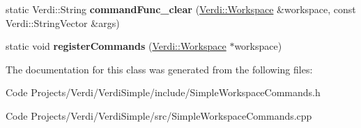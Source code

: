 \begin{DoxyCompactItemize}
\item 
\hypertarget{class_simple_workspace_commands_a002a134b75b430e11db71488aea84dcb}{static \-Verdi\-::\-String {\bfseries command\-Func\-\_\-clear} (\hyperlink{class_verdi_1_1_workspace}{\-Verdi\-::\-Workspace} \&workspace, const \-Verdi\-::\-String\-Vector \&args)}\label{class_simple_workspace_commands_a002a134b75b430e11db71488aea84dcb}

\item 
\hypertarget{class_simple_workspace_commands_affccc28717345c55a24fff58ffd2be8a}{static void {\bfseries register\-Commands} (\hyperlink{class_verdi_1_1_workspace}{\-Verdi\-::\-Workspace} $\ast$workspace)}\label{class_simple_workspace_commands_affccc28717345c55a24fff58ffd2be8a}

\end{DoxyCompactItemize}


\-The documentation for this class was generated from the following files\-:\begin{DoxyCompactItemize}
\item 
\-Code Projects/\-Verdi/\-Verdi\-Simple/include/\-Simple\-Workspace\-Commands.\-h\item 
\-Code Projects/\-Verdi/\-Verdi\-Simple/src/\-Simple\-Workspace\-Commands.\-cpp\end{DoxyCompactItemize}
